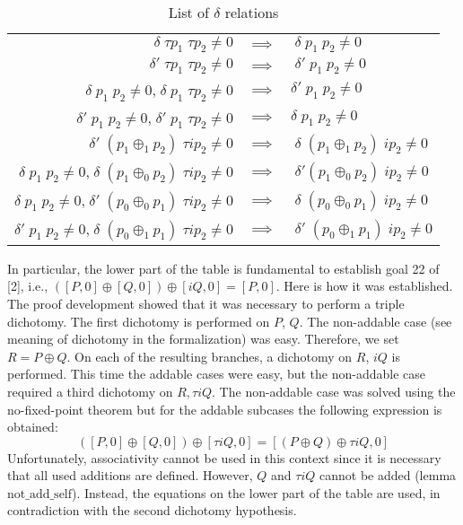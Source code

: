 \documentclass[runningheads]{llncs}
\begin{document}
\begin{table}
\begin{center}
	\begin{tabular}{ r c l }
		$\delta \; \tau p_1 \; \tau p_2 \neq 0$ & $\implies$ & $\; \delta \; p_1 \; p_2 \neq 0$ \\ 
		$\delta' \; \tau p_1 \; \tau p_2 \neq 0$ & $\implies$ & $\; \delta' \; p_1 \; p_2 \neq 0$ \\ 
		$\delta \; p_1 \; p_2 \neq 0$,$\; \delta \; p_1 \; \tau p_2 \neq 0$ & $\implies$ & $\delta' \; p_1 \; p_2 \neq 0$ \\ 
		$\delta' \; p_1 \; p_2 \neq 0$,$\; \delta' \; p_1 \; \tau p_2 \neq 0$ & $\implies$ & $\delta \; p_1 \;p_2 \neq 0$ \\ 
		\hline
	    $\delta' \; (p_1 \oplus_1 p_2) \; \tau i p_2 \neq 0$ & $\implies$ & $\; \delta \; (p_1 \oplus_1 p_2) \; i p_2 \neq 0$ \\ 
	    $\delta \; p_1 \; p_2 \neq 0$,$\; \delta \; (p_1 \oplus_0 p_2) \; \tau i p_2 \neq 0$ & $\implies$ & $\; \delta' (p_1 \oplus_0 p_2) \; i p_2 \neq 0$ \\ 
	    $\delta \; p_1 \; p_2 \neq 0$,$\; \delta' \; (p_0 \oplus_0 p_1) \; \tau i p_2 \neq 0$ & $\implies$ & $\; \delta \; (p_0 \oplus_0 p_1) \; i p_2 \neq 0$ \\ 
	    
	    $\delta' \; p_1 \; p_2 \neq 0$,$\; \delta \; (p_0 \oplus_1 p_1) \; \tau i p_2 \neq 0$ & $\implies$ & $\; \delta' \; (p_0 \oplus_1 p_1) \; i p_2 \neq 0$ \\
	\end{tabular}
\end{center}
	\caption{List of $\delta$ relations}
	\label{table:1}
\end{table}
In particular, the lower part of the table is fundamental to establish goal 22 of [2], i.e., $([P,0] \oplus [Q,0]) \oplus [iQ,0] = [P,0]$. Here is how it was established. The proof development showed that it was necessary to perform a triple dichotomy. The first dichotomy is performed on $P$, $Q$. The non-addable case (see meaning of dichotomy in the formalization) was easy. Therefore, we set $R = P \oplus Q$. On each of the resulting branches, a dichotomy on $R$, $iQ$ is performed. This time the addable cases were easy, but the non-addable case required a third dichotomy on $R,\tau i Q$. The non-addable case was solved using the no-fixed-point theorem but for the addable subcases the following expression is obtained: $$([P,0] \oplus [Q,0]) \oplus [\tau i Q,0] = [(P \oplus Q) \oplus \tau i Q,0]$$ Unfortunately, associativity cannot be used in this context since it is necessary that all used additions are defined. However, $Q$ and $\tau i Q$ cannot be added (lemma $\text{not\_add\_self}$). Instead, the equations on the lower part of the table are used, in contradiction with the second dichotomy hypothesis.
\end{document}
